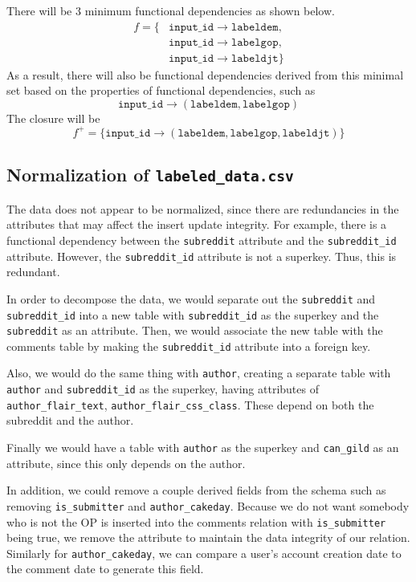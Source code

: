 \documentclass[12pt]{article}
\begin{document}
There will be 3 minimum functional dependencies as shown below.
\begin{align*}
        f = \{&\texttt{input\_id} \rightarrow \texttt{labeldem},\\
        &\texttt{input\_id} \rightarrow \texttt{labelgop},\\
        &\texttt{input\_id} \rightarrow \texttt{labeldjt}\}
\end{align*}
As a result, there will also be functional dependencies derived from this minimal set
based on the properties of functional dependencies, such as
\[\texttt{input\_id} \rightarrow (\texttt{labeldem}, \texttt{labelgop})\]
The closure will be
\[f^+ = \{\texttt{input\_id} \rightarrow (\texttt{labeldem}, \texttt{labelgop}, \texttt{labeldjt})\}\]

\subsection{Normalization of \texttt{labeled\_data.csv}}

The data does not appear to be normalized, since there are redundancies in the attributes
that may affect the insert update integrity. For example, there is a functional
dependency between the \texttt{subreddit} attribute and the \texttt{subreddit\_id} attribute.
However, the \texttt{subreddit\_id} attribute is not a superkey. Thus, this is redundant.

In order to decompose the data, we would separate out the \texttt{subreddit} and \texttt{subreddit\_id} into a new
table with \texttt{subreddit\_id} as the superkey and the \texttt{subreddit} as an attribute. Then, we would associate
the new table with the comments table by making the \texttt{subreddit\_id} attribute into a
foreign key.

Also, we would do the same thing with \texttt{author}, creating a separate table with \texttt{author} and \texttt{subreddit\_id}
as the superkey, having attributes of \texttt{author\_flair\_text}, \texttt{author\_flair\_css\_class}. These depend on both the
subreddit and the author.

Finally we would have a table with \texttt{author} as the superkey and \texttt{can\_gild} as an attribute, since this only
depends on the author.

In addition, we could remove a couple derived fields from the schema such as
removing \texttt{is\_submitter} and \texttt{author\_cakeday}. Because we do not want somebody who is not
the OP is inserted into the comments relation with \texttt{is\_submitter} being true, we remove the attribute to maintain the data
integrity of our relation. Similarly for \texttt{author\_cakeday}, we can compare a user's account creation date to the
comment date to generate this field.
\end{document}
